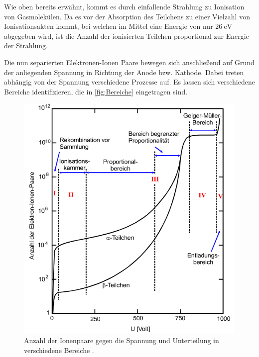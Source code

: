 Wie oben bereits erwähnt, kommt es durch einfallende Strahlung zu Ionisation von Gasmolekülen. Da es vor der Absorption des Teilchens zu einer Vielzahl von Ionisationsakten
kommt, bei welchen im Mittel eine Energie von nur $\qty{26}{\electronvolt}$ abgegeben wird, ist die Anzahl der ionisierten Teilchen proportional zur Energie der Strahlung.

Die nun separierten Elektronen-Ionen Paare bewegen sich anschließend auf Grund der anliegenden Spannung in Richtung der Anode bzw. Kathode. Dabei treten abhängig von der 
Spannung verschiedene Prozesse auf. Es lassen sich verschiedene Bereiche identifizieren, die in \autoref{fig:Bereiche} eingetragen sind.

\begin{figure}
  \centering
  \includegraphics[width = .5\textwidth]{content/Bereiche.png}
  \caption{Anzahl der Ionenpaare gegen die Spannung und Unterteilung in verschiedene Bereiche \cite{v703}.}
  \label{fig:Bereiche}
\end{figure}

